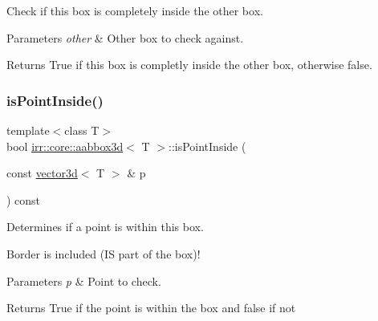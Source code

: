 Check if this box is completely inside the \textquotesingle{}other\textquotesingle{} box. 


\begin{DoxyParams}{Parameters}
{\em other} & Other box to check against. \\
\hline
\end{DoxyParams}
\begin{DoxyReturn}{Returns}
True if this box is completly inside the other box, otherwise false. 
\end{DoxyReturn}
\mbox{\label{classirr_1_1core_1_1aabbox3d_ae69d28e1e512f705a6cbf95c5829f6cd}} 
\subsubsection{\texorpdfstring{is\+Point\+Inside()}{isPointInside()}}
{\footnotesize\ttfamily template$<$class T$>$ \\
bool \hyperlink{classirr_1_1core_1_1aabbox3d}{irr\+::core\+::aabbox3d}$<$ T $>$\+::is\+Point\+Inside (\begin{DoxyParamCaption}\item[{const \hyperlink{classirr_1_1core_1_1vector3d}{vector3d}$<$ T $>$ \&}]{p }\end{DoxyParamCaption}) const\hspace{0.3cm}{\ttfamily [inline]}}



Determines if a point is within this box. 

Border is included (IS part of the box)! 
\begin{DoxyParams}{Parameters}
{\em p} & Point to check. \\
\hline
\end{DoxyParams}
\begin{DoxyReturn}{Returns}
True if the point is within the box and false if not 
\end{DoxyReturn}
\mbox{\label{classirr_1_1core_1_1aabbox3d_a0be7a03228c7af1e6c563acea4af316e}} 
